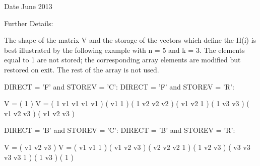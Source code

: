 \begin{DoxyDate}{Date}
June 2013 
\end{DoxyDate}
\begin{DoxyParagraph}{Further Details\+: }
\begin{DoxyVerb}  The shape of the matrix V and the storage of the vectors which define
  the H(i) is best illustrated by the following example with n = 5 and
  k = 3. The elements equal to 1 are not stored; the corresponding
  array elements are modified but restored on exit. The rest of the
  array is not used.

  DIRECT = 'F' and STOREV = 'C':         DIRECT = 'F' and STOREV = 'R':

               V = (  1       )                 V = (  1 v1 v1 v1 v1 )
                   ( v1  1    )                     (     1 v2 v2 v2 )
                   ( v1 v2  1 )                     (        1 v3 v3 )
                   ( v1 v2 v3 )
                   ( v1 v2 v3 )

  DIRECT = 'B' and STOREV = 'C':         DIRECT = 'B' and STOREV = 'R':

               V = ( v1 v2 v3 )                 V = ( v1 v1  1       )
                   ( v1 v2 v3 )                     ( v2 v2 v2  1    )
                   (  1 v2 v3 )                     ( v3 v3 v3 v3  1 )
                   (     1 v3 )
                   (        1 )\end{DoxyVerb}
 
\end{DoxyParagraph}
